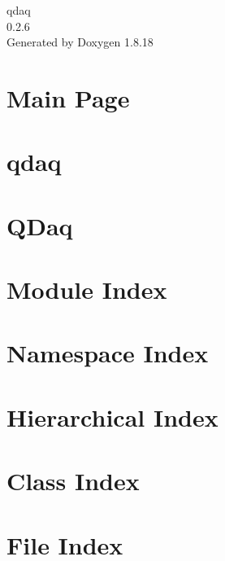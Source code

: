 \let\mypdfximage\pdfximage\def\pdfximage{\immediate\mypdfximage}\documentclass[twoside]{book}
\newcommand{\+}{\discretionary{\mbox{\scriptsize$\hookleftarrow$}}{}{}}
\newcommand{\clearemptydoublepage}{%
  \newpage{\pagestyle{empty}\cleardoublepage}%
}
\begin{document}
\hypersetup{pageanchor=false,
             bookmarksnumbered=true,
             pdfencoding=unicode
            }
\begin{titlepage}
\vspace*{7cm}
\begin{center}%
{\Large qdaq \\[1ex]\large 0.\+2.\+6 }\\
\vspace*{1cm}
{\large Generated by Doxygen 1.8.18}\\
\end{center}
\end{titlepage}
\clearemptydoublepage
{}
\tableofcontents
\clearemptydoublepage
{}
\hypersetup{pageanchor=true}

\chapter{Main Page}
\label{index}\hypertarget{index}{}
\chapter{qdaq}
\label{qdaq_app}

\chapter{Q\+Daq}
\label{md__d_1_tixt_corona_qdaq__r_e_a_d_m_e}

\chapter{Module Index}

\chapter{Namespace Index}

\chapter{Hierarchical Index}

\chapter{Class Index}

\chapter{File Index}

\end{document}
